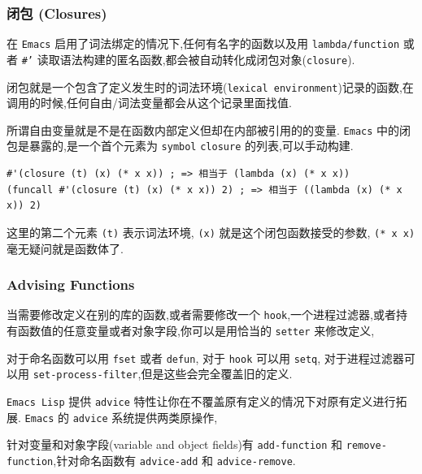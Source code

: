 \documentclass[11pt]{article}
\begin{document}
\subsubsection{闭包 (Closures)}
\label{sec:org4f01ce8}

在 \texttt{Emacs} 启用了词法绑定的情况下,任何有名字的函数以及用 \texttt{lambda/function} 或者 \texttt{\#'} 读取语法构建的匿名函数,都会被自动转化成闭包对象(\texttt{closure}).

闭包就是一个包含了定义发生时的词法环境(\texttt{lexical environment})记录的函数,在调用的时候,任何自由/词法变量都会从这个记录里面找值.

所谓自由变量就是不是在函数内部定义但却在内部被引用的的变量. \texttt{Emacs} 中的闭包是暴露的,是一个首个元素为 \texttt{symbol} \texttt{closure} 的列表,可以手动构建.

\begin{verbatim}
#'(closure (t) (x) (* x x)) ; => 相当于 (lambda (x) (* x x))
(funcall #'(closure (t) (x) (* x x)) 2) ; => 相当于 ((lambda (x) (* x x)) 2)
\end{verbatim}

这里的第二个元素 \texttt{(t)} 表示词法环境, \texttt{(x)} 就是这个闭包函数接受的参数, \texttt{(* x x)} 毫无疑问就是函数体了.



\subsubsection{Advising Functions}
\label{sec:org632874d}

当需要修改定义在别的库的函数,或者需要修改一个 \texttt{hook},一个进程过滤器,或者持有函数值的任意变量或者对象字段,你可以是用恰当的 \texttt{setter} 来修改定义,

对于命名函数可以用 \texttt{fset} 或者 \texttt{defun}, 对于 \texttt{hook} 可以用 \texttt{setq}, 对于进程过滤器可以用 \texttt{set-process-filter},但是这些会完全覆盖旧的定义.

\texttt{Emacs Lisp} 提供 \texttt{advice} 特性让你在不覆盖原有定义的情况下对原有定义进行拓展. \texttt{Emacs} 的 \texttt{advice} 系统提供两类原操作,

针对变量和对象字段(variable and object fields)有 \texttt{add-function} 和 \texttt{remove-function},针对命名函数有 \texttt{advice-add} 和 \texttt{advice-remove}.
\end{document}
